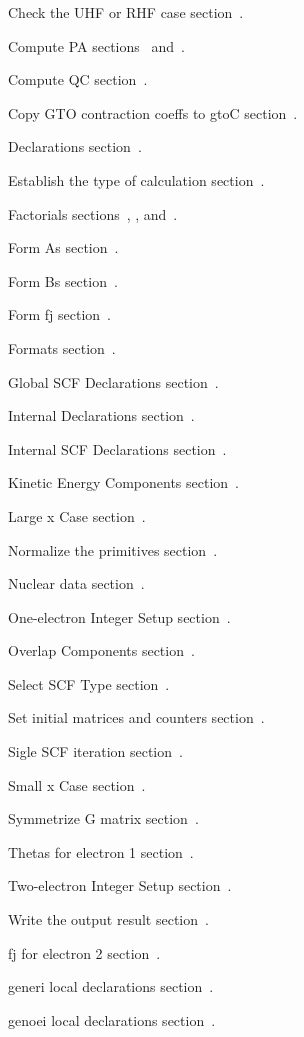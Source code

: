 \Wmods
\:Check the UHF or RHF case\X \X
\WU section~.

\:Compute PA\X \X
\WU sections~ and~.

\:Compute QC\X \X
\WU section~.

\:Copy GTO contraction coeffs to gtoC\X \X
\WU section~.

\:Declarations\X \X
\WU section~.

\:Establish the type of calculation\X \X
\WU section~.

\:Factorials\X \X
\WU sections~, , and~.

\:Form As\X \X
\WU section~.

\:Form Bs\X \X
\WU section~.

\:Form fj\X \X
\WU section~.

\:Formats\X \X
\WU section~.

\:Global SCF Declarations\X \X
\WU section~.

\:Internal Declarations\X \X
\WU section~.

\:Internal SCF Declarations\X \X
\WU section~.

\:Kinetic Energy Components\X \X
\WU section~.

\:Large x Case\X \X
\WU section~.

\:Normalize the primitives\X \X
\WU section~.

\:Nuclear data\X \X
\WU section~.

\:One-electron Integer Setup\X \X
\WU section~.

\:Overlap Components\X \X
\WU section~.

\:Select SCF Type\X \X
\WU section~.

\:Set initial matrices and counters\X \X
\WU section~.

\:Sigle SCF iteration\X \X
\WU section~.

\:Small x Case\X \X
\WU section~.

\:Symmetrize G matrix\X \X
\WU section~.

\:Thetas for electron 1\X \X
\WU section~.

\:Two-electron Integer Setup\X \X
\WU section~.

\:Write the output result\X \X
\WU section~.

\:fj for electron 2\X \X
\WU section~.

\:generi local declarations\X \X
\WU section~.

\:genoei local declarations\X \X
\WU section~.


